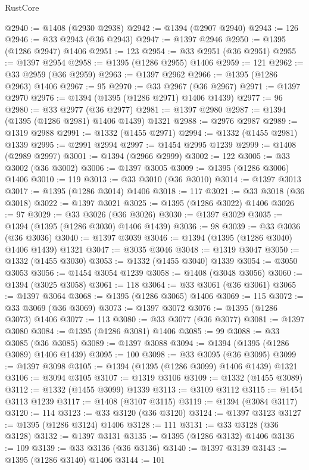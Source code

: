 \begin{lexlean}{RustCore}
\begin{coremodule}
@2940 := @1408 (@2930 @2938)
@2942 := @1394 (@2907 @2940)
@2943 := 126
@2946 := @33 @2943 (@36 @2943)
@2947 := @1397 @2946
@2950 := @1395 (@1286 @2947) @1406
@2951 := 123
@2954 := @33 @2951 (@36 @2951)
@2955 := @1397 @2954
@2958 := @1395 (@1286 @2955) @1406
@2959 := 121
@2962 := @33 @2959 (@36 @2959)
@2963 := @1397 @2962
@2966 := @1395 (@1286 @2963) @1406
@2967 := 95
@2970 := @33 @2967 (@36 @2967)
@2971 := @1397 @2970
@2976 := @1394 (@1395 (@1286 @2971) @1406 @1439)
@2977 := 96
@2980 := @33 @2977 (@36 @2977)
@2981 := @1397 @2980
@2987 := @1394 (@1395 (@1286 @2981) @1406 @1439) @1321
@2988 := @2976 @2987
@2989 := @1319 @2988
@2991 := @1332 (@1455 @2971)
@2994 := @1332 (@1455 @2981) @1339
@2995 := @2991 @2994
@2997 := @1454 @2995 @1239
@2999 := @1408 (@2989 @2997)
@3001 := @1394 (@2966 @2999)
@3002 := 122
@3005 := @33 @3002 (@36 @3002)
@3006 := @1397 @3005
@3009 := @1395 (@1286 @3006) @1406
@3010 := 119
@3013 := @33 @3010 (@36 @3010)
@3014 := @1397 @3013
@3017 := @1395 (@1286 @3014) @1406
@3018 := 117
@3021 := @33 @3018 (@36 @3018)
@3022 := @1397 @3021
@3025 := @1395 (@1286 @3022) @1406
@3026 := 97
@3029 := @33 @3026 (@36 @3026)
@3030 := @1397 @3029
@3035 := @1394 (@1395 (@1286 @3030) @1406 @1439)
@3036 := 98
@3039 := @33 @3036 (@36 @3036)
@3040 := @1397 @3039
@3046 := @1394 (@1395 (@1286 @3040) @1406 @1439) @1321
@3047 := @3035 @3046
@3048 := @1319 @3047
@3050 := @1332 (@1455 @3030)
@3053 := @1332 (@1455 @3040) @1339
@3054 := @3050 @3053
@3056 := @1454 @3054 @1239
@3058 := @1408 (@3048 @3056)
@3060 := @1394 (@3025 @3058)
@3061 := 118
@3064 := @33 @3061 (@36 @3061)
@3065 := @1397 @3064
@3068 := @1395 (@1286 @3065) @1406
@3069 := 115
@3072 := @33 @3069 (@36 @3069)
@3073 := @1397 @3072
@3076 := @1395 (@1286 @3073) @1406
@3077 := 113
@3080 := @33 @3077 (@36 @3077)
@3081 := @1397 @3080
@3084 := @1395 (@1286 @3081) @1406
@3085 := 99
@3088 := @33 @3085 (@36 @3085)
@3089 := @1397 @3088
@3094 := @1394 (@1395 (@1286 @3089) @1406 @1439)
@3095 := 100
@3098 := @33 @3095 (@36 @3095)
@3099 := @1397 @3098
@3105 := @1394 (@1395 (@1286 @3099) @1406 @1439) @1321
@3106 := @3094 @3105
@3107 := @1319 @3106
@3109 := @1332 (@1455 @3089)
@3112 := @1332 (@1455 @3099) @1339
@3113 := @3109 @3112
@3115 := @1454 @3113 @1239
@3117 := @1408 (@3107 @3115)
@3119 := @1394 (@3084 @3117)
@3120 := 114
@3123 := @33 @3120 (@36 @3120)
@3124 := @1397 @3123
@3127 := @1395 (@1286 @3124) @1406
@3128 := 111
@3131 := @33 @3128 (@36 @3128)
@3132 := @1397 @3131
@3135 := @1395 (@1286 @3132) @1406
@3136 := 109
@3139 := @33 @3136 (@36 @3136)
@3140 := @1397 @3139
@3143 := @1395 (@1286 @3140) @1406
@3144 := 101

\end{coremodule}
\end{lexlean}
